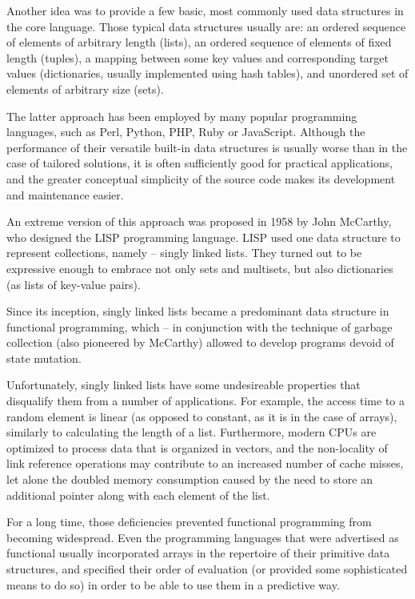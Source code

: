 Another idea was to provide a few basic, most commonly used
data structures in the core language. Those typical data structures
usually are: an ordered sequence of elements of arbitrary length
(lists), an ordered sequence of elements of fixed length (tuples),
a mapping between some key values and corresponding target values
(dictionaries, usually implemented using hash tables), and
unordered set of elements of arbitrary size (sets).

The latter approach has been employed by many popular programming
languages, such as Perl, Python, PHP, Ruby or JavaScript. Although
the performance of their versatile built-in data structures
is usually worse than in the case of tailored solutions, it
is often sufficiently good for practical applications, and the greater
conceptual simplicity of the source code makes its development
and maintenance easier.

An extreme version of this approach was proposed in 1958 by John McCarthy,
who designed the LISP programming language\cite{McCarthy1960}. LISP
used one data structure to represent collections, namely -- singly
linked lists. They turned out to be expressive enough to embrace
not only sets and multisets, but also dictionaries (as lists of key-value
pairs).

Since its inception, singly linked lists became a predominant data structure
in functional programming\cite{Bagwell2002}, which -- in conjunction
with the technique of garbage collection (also pioneered by McCarthy)
allowed to develop programs devoid of state mutation.

Unfortunately, singly linked lists have some undesireable properties
that disqualify them from a number of applications. For example,
the access time to a random element is linear (as opposed to
constant, as it is in the case of arrays), similarly to calculating
the length of a list. Furthermore, modern CPUs are optimized
to process data that is organized in vectors, and the non-locality
of link reference operations may contribute to an increased number
of cache misses, let alone the doubled memory consumption
caused by the need to store an additional pointer along with each
element of the list.

For a long time, those deficiencies prevented functional programming
from becoming widespread. Even the programming languages that were
advertised as functional usually incorporated arrays in the repertoire
of their primitive data structures, and specified their order
of evaluation\cite{R5RS} (or provided some sophisticated means
to do so\cite{Wadler1995}) in order to be able to use them
in a predictive way.

